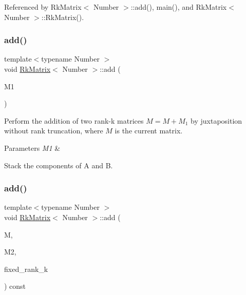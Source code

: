 Referenced by Rk\+Matrix$<$ Number $>$\+::add(), main(), and Rk\+Matrix$<$ Number $>$\+::\+Rk\+Matrix().

\mbox{\label{classRkMatrix_a8793188eb93def0030ae90e8f5898813}} 
\subsubsection{\texorpdfstring{add()}{add()}\hspace{0.1cm}{\footnotesize\ttfamily [2/4]}}
{\footnotesize\ttfamily template$<$typename Number $>$ \\
void \hyperlink{classRkMatrix}{Rk\+Matrix}$<$ Number $>$\+::add (\begin{DoxyParamCaption}\item[{const \hyperlink{classRkMatrix}{Rk\+Matrix}$<$ Number $>$ \&}]{M1 }\end{DoxyParamCaption})}

Perform the addition of two rank-\/k matrices $M = M + M_1$ by juxtaposition without rank truncation, where $M$ is the current matrix. 
\begin{DoxyParams}{Parameters}
{\em M1} & \\
\hline
\end{DoxyParams}
Stack the components of {\ttfamily A} and {\ttfamily B}.\mbox{\label{classRkMatrix_ad8668d42978011b3e65d0381bfb068d5}} 
\subsubsection{\texorpdfstring{add()}{add()}\hspace{0.1cm}{\footnotesize\ttfamily [3/4]}}
{\footnotesize\ttfamily template$<$typename Number $>$ \\
void \hyperlink{classRkMatrix}{Rk\+Matrix}$<$ Number $>$\+::add (\begin{DoxyParamCaption}\item[{\hyperlink{classRkMatrix}{Rk\+Matrix}$<$ Number $>$ \&}]{M,  }\item[{const \hyperlink{classRkMatrix}{Rk\+Matrix}$<$ Number $>$ \&}]{M2,  }\item[{const \hyperlink{classRkMatrix_add060bfc3a4cc77f858c3d6dd58cadd5}{size\+\_\+type}}]{fixed\+\_\+rank\+\_\+k }\end{DoxyParamCaption}) const}

